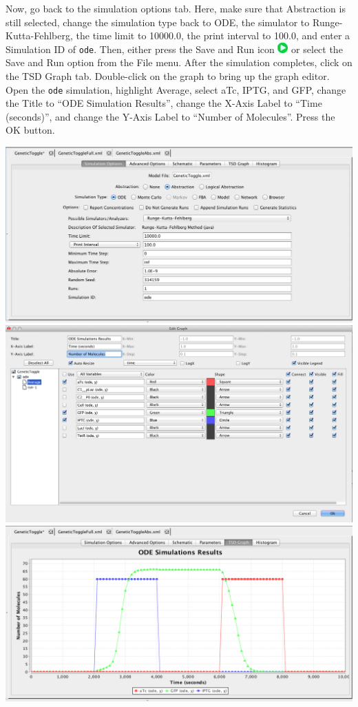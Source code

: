 \documentclass[titlepage,11pt]{article}
\begin{document}
Now, go back to the simulation options tab.  Here, make sure that Abstraction is still selected, change the simulation type back to ODE, the simulator to Runge-Kutta-Fehlberg,  the time limit to 10000.0, the print interval to 100.0, and enter a Simulation ID of {\tt ode}.  Then, either press the Save and Run icon \includegraphics{../gui/icons/run-icon} or select the Save and Run option from the File menu.
After the simulation completes, click on the TSD Graph tab.  Double-click on the graph to bring up the graph editor.
Open the {\tt ode} simulation, highlight Average, select aTc, IPTG, and GFP, change the Title to ``ODE Simulation Results'', change the X-Axis Label to ``Time (seconds)'', and change the Y-Axis Label to ``Number of Molecules''.  
Press the OK button.  

\begin{center}
\includegraphics[width=160mm]{screenshots/odeSimGT}\\
\includegraphics[width=160mm]{screenshots/odeResultsGT}\\
\includegraphics[width=160mm]{screenshots/odeSimResultsGT}
\end{center}
\end{document}
